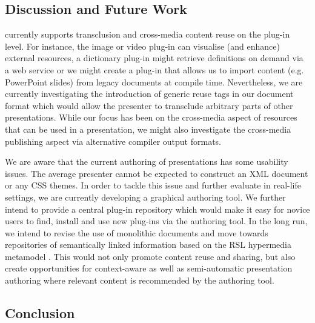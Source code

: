    \subsection{Discussion and Future Work}

    \mxp currently supports transclusion and cross-media content reuse on the
    plug-in level. For instance, the image or video plug-in can visualise (and
    enhance) external resources, a dictionary plug-in might retrieve
    definitions on demand via a web service or we might create a plug-in that
    allows us to import content (e.g. PowerPoint slides) from legacy documents
    at compile time. Nevertheless, we are currently investigating the
    introduction of generic reuse tags in our document format which would allow
    the presenter to transclude arbitrary parts of other \mxp presentations.
    While our focus has been on the cross-media aspect of resources that can be
    used in a presentation, we might also investigate the cross-media
    publishing aspect via alternative compiler output formats.

    We are aware that the current authoring of \mxp presentations has some
    usability issues. The average presenter cannot be expected to construct an
    XML document or any CSS themes. In order to tackle this issue and further
    evaluate \mxp in real-life settings, we are currently developing a
    graphical \mxp authoring tool. We further intend to provide a central
    plug-in repository which would make it easy for novice users to find,
    install and use new plug-ins via the authoring tool. In the long run, we
    intend to revise the use of monolithic documents and move towards
    repositories of semantically linked information based on the RSL hypermedia
    metamodel \citep{signer-3}. This would not only promote content reuse and
    sharing, but also create opportunities for context-aware as well as
    semi-automatic presentation authoring where relevant content is recommended
    by the authoring tool.

   \subsection{Conclusion}

